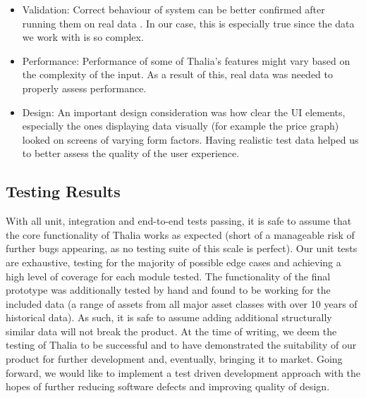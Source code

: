 \documentclass[main.tex]{subfiles}
\begin{document}
\begin{itemize}

\item Validation:
Correct behaviour of system can be better confirmed after running them on real data \cite{liveData}. In our case, this is especially true since the data we work with is so complex.

\item Performance:
Performance of some of Thalia's features might vary based on the complexity of the input. As a result of this, real data was needed to properly assess performance.

\item Design:
An important design consideration was how clear the UI elements, especially the ones displaying data visually (for example the price graph) looked on screens of varying form factors. Having realistic test data helped us to better assess the quality of the user experience.

\end{itemize}
 

\subsection{Testing Results}

With all unit, integration and end-to-end tests passing, it is safe to assume that the core functionality of Thalia works as expected (short of a manageable risk of further bugs appearing, as no testing suite of this scale is perfect). Our unit tests are exhaustive, testing for the majority of possible edge cases and achieving a high level of coverage for each module tested. The functionality of the final prototype was additionally tested by hand and found to be working for the included data (a range of assets from all major asset classes with over 10 years of historical data). As such, it is safe to assume adding additional structurally similar data will not break the product.
At the time of writing, we deem the testing of Thalia to be successful and to have demonstrated the suitability of our product for further development and, eventually, bringing it to market. Going forward, we would like to implement a test driven development approach with the hopes of further reducing software defects and  improving quality of design\cite{TDD}.
\end{document}

